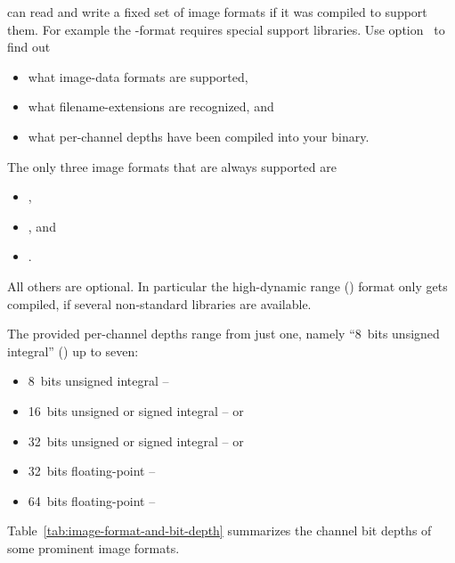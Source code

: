 \App{} can read and write a fixed set of image formats if it was
compiled to support them.  For example the -format
requires special support libraries.  Use
option~ to find out

\begin{itemize}
\item what image-data formats are supported,
\item what filename-extensions are recognized, and
\item what per-channel depths have been compiled into your \appcmd{}
  binary.
\end{itemize}

\noindent The only three image formats that are always supported are
\begin{itemize}
\item {},
\item {}, and
\item {}.
\end{itemize}

\noindent All others are optional.  In particular the high-dynamic
range () format  only gets compiled, if
several non-standard libraries are available.

The provided per-channel depths range from just one, namely ``8~bits
unsigned integral'' () up to seven:
  \begin{itemize}
  \item 8~bits unsigned integral -- 
  \item 16~bits unsigned or signed integral --  or 
  \item 32~bits unsigned or signed integral --  or 
  \item 32~bits floating-point -- 
  \item 64~bits floating-point -- 
  \end{itemize}

  Table~\ref{tab:image-format-and-bit-depth} summarizes the channel
  bit depths of some prominent image formats.

